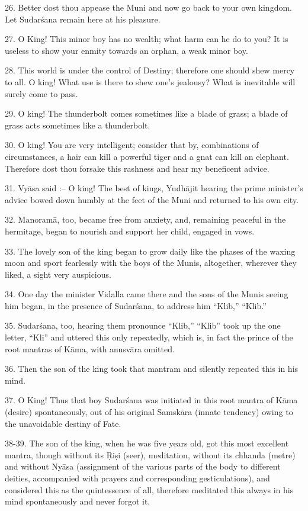 26. Better dost thou appease the Muni and now go back to your own kingdom. Let Sudar\'sana remain here at his pleasure.

27. O King! This minor boy has no wealth; what harm can he do to you? It is useless to show your enmity towards an orphan, a weak minor boy.

28. This world is under the control of Destiny; therefore one should shew mercy to all. O king! What use is there to shew one's jealousy? What is inevitable will surely come to pass.

29. O king! The thunderbolt comes sometimes like a blade of grass; a blade of grass acts sometimes like a thunderbolt.

30. O king! You are very intelligent; consider that by, combinations of circumstances, a hair can kill a powerful tiger and a gnat can kill an elephant. Therefore dost thou forsake this rashness and hear my beneficent advice.

31. Vy\=asa said :-- O king! The best of kings, Yudh\=ajit hearing the prime minister's advice bowed down humbly at the feet of the Muni and returned to his own city.

32. Manoram\=a, too, became free from anxiety, and, remaining peaceful in the hermitage, began to nourish and support her child, engaged in vows.

33. The lovely son of the king began to grow daily like the phases of the waxing moon and sport fearlessly with the boys of the Munis, altogether, wherever they liked, a sight very auspicious.

34. One day the minister Vidalla came there and the sons of the Munis seeing him began, in the presence of Sudar\'sana, to address him ``Klib,'' ``Klib.''

35. Sudar\'sana, too, hearing them pronounce ``Klib,'' ``Klib'' took up the one letter, ``Kli'' and uttered this only repeatedly, which is, in fact the prince of the root mantras of K\=ama, with anusv\=ara omitted.

36. Then the son of the king took that mantram and silently repeated this in his mind.

37. O King! Thus that boy Sudar\'sana was initiated in this root mantra of K\=ama (desire) spontaneously, out of his original Samsk\=ara (innate tendency) owing to the unavoidable destiny of Fate.

38-39. The son of the king, when he was five years old, got this most excellent mantra, though without its \d{R}i\d{s}i (seer), meditation, without its chhanda (metre) and without Ny\=asa (assignment of the various parts of the body to different deities, accompanied with prayers and corresponding gesticulations), and considered this as the quintessence of all, therefore meditated this always in his mind spontaneously and never forgot it.

